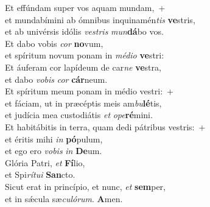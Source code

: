 \evenverse Et effúndam super vos aquam mundam,~+\\\evenverse  et mundabímini ab ómnibus inquinamén\textit{tis} \textbf{ve}stris,~\*\\
\evenverse et ab univérsis idólis \textit{ve}\textit{stris} \textit{mun}\textbf{dá}bo vos.\\
\oddverse Et dabo vobis \textit{cor} \textbf{no}vum,~\*\\
\oddverse et spíritum novum ponam in \textit{mé}\textit{di}\textit{o} \textbf{ve}stri:\\
\evenverse Et áuferam cor lapídeum de car\textit{ne} \textbf{ve}stra,~\*\\
\evenverse et dabo \textit{vo}\textit{bis} \textit{cor} \textbf{cár}neum.\\
\oddverse Et spíritum meum ponam in médio vestri:~+\\
\oddverse  et fáciam, ut in præcéptis meis am\textit{bu}\textbf{lé}tis,~\*\\
\oddverse et judícia mea custodiátis \textit{et} \textit{o}\textit{pe}\textbf{ré}mini.\\
\evenverse Et habitábitis in terra, quam dedi pátribus vestris:~+\\
\evenverse  et éritis mihi \textit{in} \textbf{pó}pulum,~\*\\
\evenverse et ego ero \textit{vo}\textit{bis} \textit{in} \textbf{De}um.\\
\oddverse Glória Patri, \textit{et} \textbf{Fí}lio,~\*\\
\oddverse et Spi\textit{rí}\textit{tu}\textit{i} \textbf{San}cto.\\
\evenverse Sicut erat in princípio, et nunc, \textit{et} \textbf{sem}per,~\*\\
\evenverse et in sǽcula sæ\textit{cu}\textit{ló}\textit{rum}. \textbf{A}men.\\
